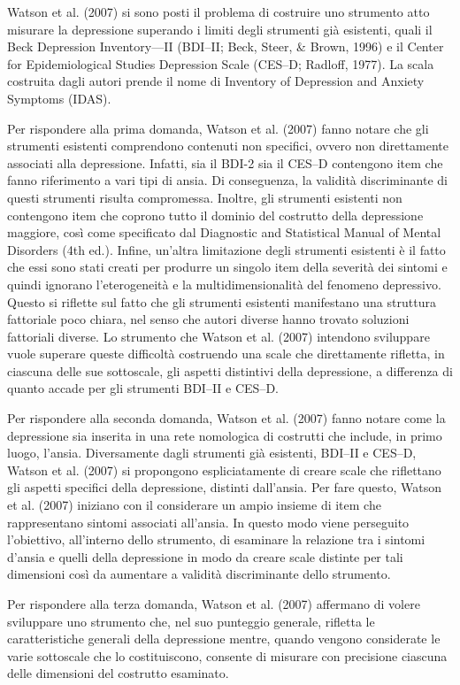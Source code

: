 \begin{exmp}
Watson et al. (2007) si sono posti il problema di costruire uno strumento atto misurare la depressione superando i limiti degli strumenti già esistenti, quali il Beck Depression Inventory—II (BDI–II; Beck, Steer, \& Brown, 1996) e il Center for Epidemiological Studies Depression Scale (CES–D; Radloff, 1977). La scala costruita dagli autori prende il nome di Inventory of Depression and Anxiety Symptoms (IDAS). 

Per rispondere alla prima domanda, Watson et al. (2007) fanno notare che gli strumenti esistenti comprendono contenuti non specifici, ovvero non direttamente associati alla depressione. Infatti, sia il BDI-2 sia il CES–D contengono item che fanno riferimento a vari tipi di ansia. Di conseguenza, la validità discriminante di questi strumenti risulta compromessa. Inoltre, gli strumenti esistenti non contengono item che coprono tutto il dominio del costrutto della depressione maggiore, così come specificato dal Diagnostic and Statistical Manual of Mental Disorders (4th ed.). Infine, un'altra limitazione degli strumenti esistenti è il fatto che essi sono stati creati per produrre un singolo item della severità dei sintomi e quindi ignorano l'eterogeneità e la multidimensionalità del fenomeno depressivo. Questo si riflette sul fatto che gli strumenti esistenti manifestano una struttura fattoriale poco chiara, nel senso che autori diverse hanno trovato soluzioni fattoriali diverse. Lo strumento che Watson et al. (2007) intendono sviluppare vuole superare queste difficoltà costruendo una scale che direttamente rifletta, in ciascuna delle sue sottoscale, gli aspetti distintivi della depressione, a differenza di quanto accade per gli strumenti BDI–II e CES–D. 

Per rispondere alla seconda domanda, Watson et al. (2007) fanno notare come la depressione sia inserita in una rete nomologica di costrutti che include, in primo luogo, l'ansia. Diversamente dagli strumenti già esistenti, BDI–II e CES–D, Watson et al. (2007) si propongono espliciatamente di creare scale che riflettano gli aspetti specifici della depressione, distinti dall'ansia. Per fare questo, Watson et al. (2007) iniziano con il considerare un ampio insieme di item che rappresentano sintomi associati all'ansia. In questo modo viene perseguito l'obiettivo, all'interno dello strumento, di esaminare la relazione tra i sintomi d'ansia e quelli della depressione in modo da creare scale distinte per tali dimensioni così da aumentare a validità discriminante dello strumento.

Per rispondere alla terza domanda, Watson et al. (2007) affermano di volere sviluppare uno strumento che, nel suo punteggio generale, rifletta le caratteristiche generali della depressione mentre, quando vengono considerate le varie sottoscale che lo costituiscono, consente di misurare con precisione ciascuna delle dimensioni del costrutto esaminato.
\end{exmp}


